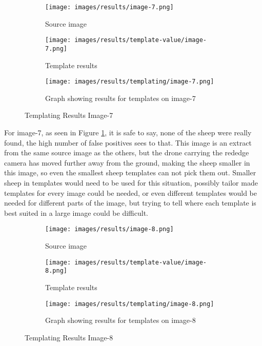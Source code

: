 \begin{figure}[H]
    \centering
    
    \begin{subfigure}{0.5\textwidth}
        \centering
        \texttt{[image: images/results/image-7.png]}
        \caption{Source image}
    \end{subfigure}%
    \begin{subfigure}{0.5\textwidth}
        \centering
        \texttt{[image: images/results/template-value/image-7.png]}
        \caption{Template results}
    \end{subfigure}
    \begin{subfigure}{\textwidth}
    \centering
        \texttt{[image: images/results/templating/image-7.png]}
        \caption{Graph showing results for templates on image-7}
    \end{subfigure}
    
    \caption{Templating Results Image-7}
    \label{fig:Templating-Results-Image-7}
\end{figure}


For image-7, as seen in Figure \ref{fig:Templating-Results-Image-7}, it is safe to say, none of the sheep were really found, the high number of false positives sees to that. This image is an extract from the same source image as the others, but the drone carrying the rededge camera has moved further away from the ground, making the sheep smaller in this image, so even the smallest sheep templates can not pick them out. Smaller sheep in templates would need to be used for this situation, possibly tailor made templates for every image could be needed, or even different templates would be needed for different parts of the image, but trying to tell where each template is best suited in a large image could be difficult.

\begin{figure}[H]
    \centering
    
    \begin{subfigure}{0.5\textwidth}
        \centering
        \texttt{[image: images/results/image-8.png]}
        \caption{Source image}
    \end{subfigure}%
    \begin{subfigure}{0.5\textwidth}
        \centering
        \texttt{[image: images/results/template-value/image-8.png]}
        \caption{Template results}
    \end{subfigure}
    \begin{subfigure}{\textwidth}
    \centering
        \texttt{[image: images/results/templating/image-8.png]}
        \caption{Graph showing results for templates on image-8}
    \end{subfigure}
    
    \caption{Templating Results Image-8}
    \label{fig:Templating-Results-Image-8}
\end{figure}

